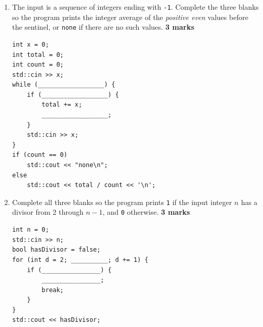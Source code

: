 \documentclass[11pt,a4paper]{article}
\begin{document}
\begin{enumerate}[label=\textbf{(\alph*)},start=5,itemsep=8pt]
\item The input is a sequence of integers ending with \lstinline|-1|. Complete the three blanks so the program prints the integer average of the \emph{positive even} values before the sentinel, or \lstinline|none| if there are no such values. \hfill\textbf{3 marks}

\begin{lstlisting}[style=cppfill]
int x = 0;
int total = 0;
int count = 0;
std::cin >> x;
while (__________________) {
    if (__________________) {
        total += x;
        __________________;
    }
    std::cin >> x;
}
if (count == 0)
    std::cout << "none\n";
else
    std::cout << total / count << '\n';
\end{lstlisting}

\item Complete all three blanks so the program prints \lstinline|1| if the input integer $n$ has a divisor from 2 through $n-1$, and \lstinline|0| otherwise. \hfill\textbf{3 marks}
\begin{lstlisting}[style=cppfill]
int n = 0;
std::cin >> n;
bool hasDivisor = false;
for (int d = 2; __________; d += 1) {
    if (________________) {
        ________________;
        break;
    }
}
std::cout << hasDivisor;
\end{lstlisting}
\end{enumerate}
\end{document}
